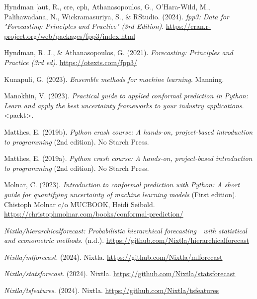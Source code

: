 \documentclass[
  american,
  10,
  a4paper,
]{book}
\newlength{\cslhangindent}
\newenvironment{CSLReferences}[2] %
 {\begin{list}{}{%
  \setlength{\itemindent}{0pt}
  \setlength{\leftmargin}{0pt}
  \setlength{\parsep}{0pt}
  \ifodd #1
   \setlength{\leftmargin}{\cslhangindent}
   \setlength{\itemindent}{-1\cslhangindent}
  \fi
  \setlength{\itemsep}{#2\baselineskip}}}
 {\end{list}}
\theoremstyle{definition}
\theoremstyle{remark}
\begin{document}
\begin{CSLReferences}{1}{0}
Hyndman {[}aut, R., cre, cph, Athanasopoulos, G., O'Hara-Wild, M.,
Palihawadana, N., Wickramasuriya, S., \& RStudio. (2024). \emph{fpp3:
{Data} for "{Forecasting}: {Principles} and {Practice}" (3rd
{Edition})}.
\url{https://cran.r-project.org/web/packages/fpp3/index.html}

Hyndman, R. J., \& Athanasopoulos, G. (2021). \emph{Forecasting:
{Principles} and {Practice} (3rd ed)}. \url{https://otexts.com/fpp3/}

Kunapuli, G. (2023). \emph{Ensemble methods for machine learning}.
Manning.

Manokhin, V. (2023). \emph{Practical guide to applied conformal
prediction in {Python}: Learn and apply the best uncertainty frameworks
to your industry applications}. {\textless{}}packt{\textgreater{}}.

Matthes, E. (2019b). \emph{Python crash course: A hands-on,
project-based introduction to programming} (2nd edition). No Starch
Press.

Matthes, E. (2019a). \emph{Python crash course: A hands-on,
project-based introduction to programming} (2nd edition). No Starch
Press.

Molnar, C. (2023). \emph{Introduction to conformal prediction with
{Python}: A short guide for quantifying uncertainty of machine learning
models} (First edition). Chistoph Molnar c/o MUCBOOK, Heidi Seibold.
\url{https://christophmolnar.com/books/conformal-prediction/}

\emph{Nixtla/hierarchicalforecast: Probabilistic hierarchical
forecasting 👑 with statistical and econometric methods.} (n.d.).
\url{https://github.com/Nixtla/hierarchicalforecast}

\emph{Nixtla/mlforecast}. (2024). Nixtla.
\url{https://github.com/Nixtla/mlforecast}

\emph{Nixtla/statsforecast}. (2024). Nixtla.
\url{https://github.com/Nixtla/statsforecast}

\emph{Nixtla/tsfeatures}. (2024). Nixtla.
\url{https://github.com/Nixtla/tsfeatures}


\end{CSLReferences}
\end{document}

